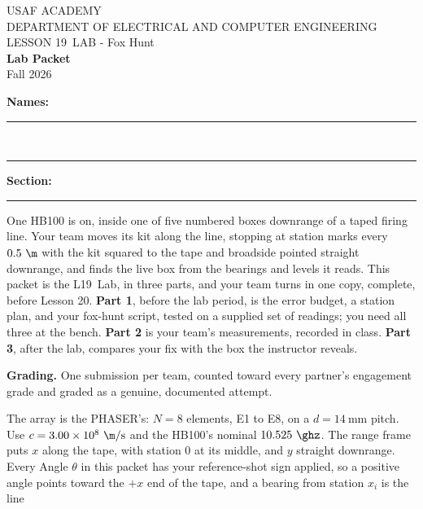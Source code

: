\documentclass{exam}
\def\labLesson{19}
\def\thisterm{\thisTermIn}
\def\thisterm{Fall 2026}
\begin{document}
\pagestyle{headandfoot}   %



\begin{center}
USAF ACADEMY \\
DEPARTMENT OF ELECTRICAL AND COMPUTER ENGINEERING \\
LESSON \labLesson\ LAB - Fox Hunt \\
\textbf{Lab Packet} \\
\thisterm \\[4mm]
\end{center}

\vspace{-4pt}
\textbf{Names:} \rule[-2pt]{2.2in}{0.4pt}\ \ \rule[-2pt]{2.2in}{0.4pt} \hfill
\textbf{Section:} \rule[-2pt]{0.7in}{0.4pt}

\vspace{4pt}


\vspace{2pt}

One HB100 is on, inside one of five numbered boxes downrange of a taped firing
line. Your team moves its kit along the line, stopping at station marks every
$0.5\ \m$ with the kit squared to the tape and broadside pointed straight
downrange, and finds the live box from the bearings and levels it reads. This
packet is the L\labLesson\ Lab, in three parts, and your team turns in one copy,
complete, before Lesson 20. \textbf{Part 1}, before the lab period, is the error
budget, a station plan, and your fox-hunt script, tested on a supplied set of
readings; you need all three at the bench. \textbf{Part 2} is your team's
measurements, recorded in class. \textbf{Part 3}, after the lab, compares your
fix with the box the instructor reveals.

\textbf{Grading.} One submission per team, counted toward every partner's
engagement grade and graded as a genuine, documented attempt.

The array is the PHASER's: $N = 8$ elements, E1 to E8, on a $d = 14\ \text{mm}$
pitch. Use $c = 3.00\times 10^{8}\ \m/\text{s}$ and the HB100's nominal
$10.525\ \ghz$. The range frame puts $x$ along the tape, with station 0 at its
middle, and $y$ straight downrange. Every Angle $\theta$ in this packet
has your reference-shot sign applied, so a positive angle points toward the
$+x$ end of the tape, and a bearing from station $x_i$ is the line
\end{document}
